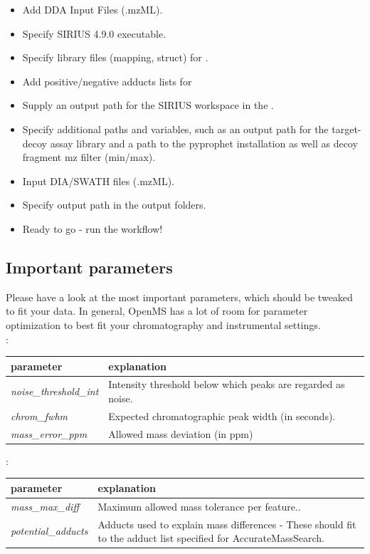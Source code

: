 \begin{itemize}
\item Add DDA Input Files (.mzML).
\item Specify SIRIUS 4.9.0 executable.
\item Specify library files (mapping, struct) for .
\item Add positive/negative adducts lists for 
\item Supply an output path for the SIRIUS workspace in the .
\item Specify additional paths and variables, such as an output path for the target-decoy assay library and a path to the pyprophet installation as well as decoy fragment mz filter (min/max).
\item Input DIA/SWATH files (.mzML).
\item Specify output path in the output folders.
\item Ready to go - run the workflow! 
\end{itemize}

\subsection{Important parameters}
\noindent Please have a look at the most important parameters, which should be tweaked to fit your data. In general, OpenMS has a lot of room for parameter optimization to best fit your chromatography and instrumental settings. \\

\noindent{}:
\begin{center}
\begin{tabular*}{\textwidth}{ p{5.5cm}|p{10.5cm} }
\textbf{parameter} & \textbf{explanation} \\ \hline
\textit{noise\_threshold\_int} & Intensity threshold below which peaks are regarded as noise. \\
\textit{chrom\_fwhm} & Expected chromatographic peak width (in seconds). \\
\textit{mass\_error\_ppm} & Allowed mass deviation (in ppm) \\
\end{tabular*}
\end{center}

\noindent{}:
\begin{center}
\begin{tabular*}{\textwidth}{ p{5.5cm}|p{10.5cm} }
\textbf{parameter} & \textbf{explanation} \\ \hline
\textit{mass\_max\_diff} & Maximum allowed mass tolerance per feature.. \\
\textit{potential\_adducts} & Adducts used to explain mass differences - These should fit to the adduct list specified for AccurateMassSearch. \\
\end{tabular*}
\end{center}

